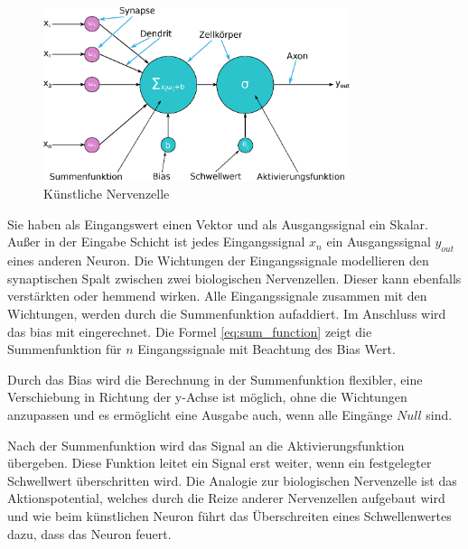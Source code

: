 \begin{figure}[!ht]
	\includegraphics[width=0.8\textwidth]{content/chapter_basics/images/artificial_neuron.eps}
	\centering
	\caption{Künstliche Nervenzelle}
	\label{img:artificial_neuron}
\end{figure}

Sie haben als Eingangswert einen Vektor und als Ausgangssignal ein Skalar. Außer in der Eingabe Schicht ist jedes Eingangssignal $x_n$ ein Ausgangssignal $y_{out}$ eines anderen Neuron. Die Wichtungen der Eingangssignale modellieren den synaptischen Spalt zwischen zwei biologischen Nervenzellen. Dieser kann ebenfalls verstärkten oder hemmend wirken. Alle Eingangssignale zusammen mit den Wichtungen, werden durch die Summenfunktion aufaddiert. Im Anschluss wird das \gls{bias} mit eingerechnet. Die Formel \ref{eq:sum_function} zeigt die Summenfunktion für $n$ Eingangssignale mit Beachtung des Bias Wert.


Durch das Bias wird die Berechnung in der Summenfunktion flexibler, eine Verschiebung in Richtung der y-Achse ist möglich, ohne die Wichtungen anzupassen und es ermöglicht eine Ausgabe auch, wenn alle Eingänge $Null$ sind.\vspace{0.2cm}

Nach der Summenfunktion wird das Signal an die Aktivierungsfunktion übergeben. Diese Funktion leitet ein Signal erst weiter, wenn ein festgelegter Schwellwert überschritten wird. Die Analogie zur biologischen Nervenzelle ist das Aktionspotential, welches durch die Reize anderer Nervenzellen aufgebaut wird und wie beim künstlichen Neuron führt das Überschreiten eines Schwellenwertes dazu, dass das Neuron \glqq feuert\grqq. \vspace{0.2cm}

